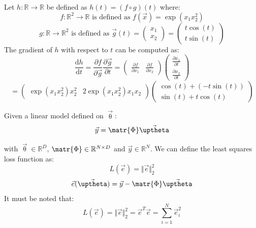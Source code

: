 \begin{description}
        \begin{example}
            Let $h: \mathbb{R} \rightarrow \mathbb{R}$ be defined as $h(t) = (f \circ g)(t)$ where:
            \[ f: \mathbb{R}^2 \rightarrow \mathbb{R} \text{ is defined as } f(\vec{x}) = \exp(x_1 x_2^2) \]
            \[ 
                g: \mathbb{R} \rightarrow \mathbb{R}^2 \text{ is defined as } 
                \vec{g}(t) = \begin{pmatrix} x_1 \\ x_2 \end{pmatrix} = \begin{pmatrix}t \cos(t) \\ t \sin(t) \end{pmatrix}
            \]
            The gradient of $h$ with respect to $t$ can be computed as:
            \[
                \frac{\text{d} h}{\text{d} t} =
                    \frac{\partial f}{\partial \vec{g}} \frac{\partial \vec{g}}{\partial t} =
                    \begin{pmatrix}
                        \frac{\partial f}{\partial x_1} & \frac{\partial f}{\partial x_2}
                    \end{pmatrix}
                    \begin{pmatrix}
                        \frac{\partial x_1}{\partial t} \\ \frac{\partial x_2}{\partial t}
                    \end{pmatrix}
            \]
            \[
                = 
                \begin{pmatrix} \exp(x_1 x_2^2)x_2^2 & 2\exp(x_1 x_2^2)x_1 x_2 \end{pmatrix}
                \begin{pmatrix} \cos(t) + (-t\sin(t)) \\ \sin(t) + t\cos(t) \end{pmatrix}
            \]
        \end{example}

        \begin{example} 
            Given a linear model defined on $\vec{\uptheta}$:
            \[ \vec{y} = \matr{\Phi}\vec{\uptheta} \]
        \end{example}
        with $\vec{\uptheta} \in \mathbb{R}^D$, $\matr{\Phi} \in \mathbb{R}^{N \times D}$ and $\vec{y} \in \mathbb{R}^N$.
        We can define the least squares loss function as:
        \[ L(\vec{e}) = \Vert \vec{e} \Vert_2^2 \]
        \[ \vec{e}(\vec{\uptheta}) = \vec{y} - \matr{\Phi}\vec{\uptheta} \]
        It must be noted that:
        \[ L(\vec{e}) = \Vert \vec{e} \Vert_2^2 = \vec{e}^T\vec{e} = \sum_{i=1}^{N} \vec{e}_i^2 \]


\end{description}
